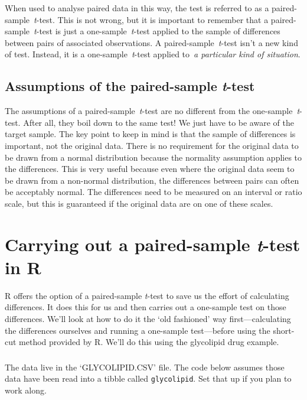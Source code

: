 \documentclass[
]{book}
\newenvironment{greybox}{
  \definecolor{shadecolor}{rgb}{0.95,0.95,0.95}  %
  \color{black}
  \begin{shaded}}
 {\end{shaded}}
\newenvironment{infobox}[1]
  {
  \begin{itemize}
  \renewcommand{\labelitemi}{
    \raisebox{-.7\height}[0pt][0pt]{
      {\setkeys{Gin}{width=3em,keepaspectratio}
        \texttt{[image: images/\#1]}}
    }
  }
  \setlength{\fboxsep}{1em}
  \begin{greybox}
  \item
  }
  {
  \end{greybox}
  \end{itemize}
  }
\begin{document}
When used to analyse paired data in this way, the test is referred to as a paired-sample~\emph{t}-test. This is not wrong, but it is important to remember that a paired-sample~\emph{t}-test is just a one-sample~\emph{t}-test applied to the sample of differences between pairs of associated observations. A paired-sample~\emph{t}-test isn't a new kind of test. Instead, it is a one-sample~\emph{t}-test applied to~\emph{a particular kind of situation}.

\hypertarget{assumptions-of-the-paired-sample-t-test}{%
\subsection{\texorpdfstring{Assumptions of the paired-sample \emph{t}-test}{Assumptions of the paired-sample t-test}}\label{assumptions-of-the-paired-sample-t-test}}

The assumptions of a paired-sample~\emph{t}-test are no different from the one-sample~\emph{t}-test. After all, they boil down to the same test! We just have to be aware of the target sample. The key point to keep in mind is that the sample of differences is important, not the original data. There is no requirement for the original data to be drawn from a normal distribution because the normality assumption applies to the differences. This is very useful because even where the original data seem to be drawn from a non-normal distribution, the differences between pairs can often be acceptably normal. The differences need to be measured on an interval or ratio scale, but this is guaranteed if the original data are on one of these scales.

\hypertarget{carrying-out-a-paired-sample-t-test-in-r}{%
\section{\texorpdfstring{Carrying out a paired-sample \emph{t}-test in R}{Carrying out a paired-sample t-test in R}}\label{carrying-out-a-paired-sample-t-test-in-r}}

R offers the option of a paired-sample \emph{t}-test to save us the effort of calculating differences. It does this for us and then carries out a one-sample test on those differences. We'll look at how to do it the `old fashioned' way first---calculating the differences ourselves and running a one-sample test---before using the short-cut method provided by R. We'll do this using the glycolipid drug example.

\begin{infobox}{action}

\hypertarget{section-10}{%
\subsubsection*{}\label{section-10}}

The data live in the `GLYCOLIPID.CSV' file. The code below assumes those data have been read into a tibble called \texttt{glycolipid}. Set that up if you plan to work along.

\end{infobox}
\end{document}

